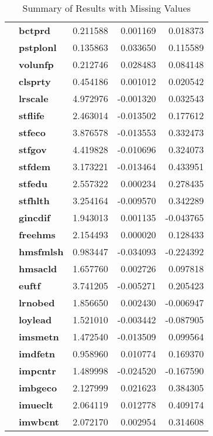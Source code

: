 \begin{table}[H]
\begin{tabular}{llrrr}
    \textbf{} & \textbf{bctprd} & 0.211588 & 0.001169 & 0.018373 \\
    \textbf{} & \textbf{pstplonl} & 0.135863 & 0.033650 & 0.115589 \\
    \textbf{} & \textbf{volunfp} & 0.212746 & 0.028483 & 0.084148 \\
    \textbf{} & \textbf{clsprty} & 0.454186 & 0.001012 & 0.020542 \\
    \textbf{} & \textbf{lrscale} & 4.972976 & -0.001320 & 0.032543 \\
    \textbf{} & \textbf{stflife} & 2.463014 & -0.013502 & 0.177612 \\
    \textbf{} & \textbf{stfeco} & 3.876578 & -0.013553 & 0.332473 \\
    \textbf{} & \textbf{stfgov} & 4.419828 & -0.010696 & 0.324073 \\
    \textbf{} & \textbf{stfdem} & 3.173221 & -0.013464 & 0.433951 \\
    \textbf{} & \textbf{stfedu} & 2.557322 & 0.000234 & 0.278435 \\
    \textbf{} & \textbf{stfhlth} & 3.254164 & -0.009570 & 0.342289 \\
    \textbf{} & \textbf{gincdif} & 1.943013 & 0.001135 & -0.043765 \\
    \textbf{} & \textbf{freehms} & 2.154493 & 0.000020 & 0.128433 \\
    \textbf{} & \textbf{hmsfmlsh} & 0.983447 & -0.034093 & -0.224392 \\
    \textbf{} & \textbf{hmsacld} & 1.657760 & 0.002726 & 0.097818 \\
    \textbf{} & \textbf{euftf} & 3.741205 & -0.005271 & 0.205423 \\
    \textbf{} & \textbf{lrnobed} & 1.856650 & 0.002430 & -0.006947 \\
    \textbf{} & \textbf{loylead} & 1.521010 & -0.003442 & -0.087905 \\
    \textbf{} & \textbf{imsmetn} & 1.472540 & -0.013509 & 0.099564 \\
    \textbf{} & \textbf{imdfetn} & 0.958960 & 0.010774 & 0.169370 \\
    \textbf{} & \textbf{impcntr} & 1.489998 & -0.024520 & -0.167590 \\
    \textbf{} & \textbf{imbgeco} & 2.127999 & 0.021623 & 0.384305 \\
    \textbf{} & \textbf{imueclt} & 2.064119 & 0.012778 & 0.409174 \\
    \textbf{} & \textbf{imwbcnt} & 2.072170 & 0.002954 & 0.314608 \\
    \cline{1-5}
    \bottomrule
    \end{tabular}
    \caption{Summary of Results with Missing Values}
\end{table}
    

